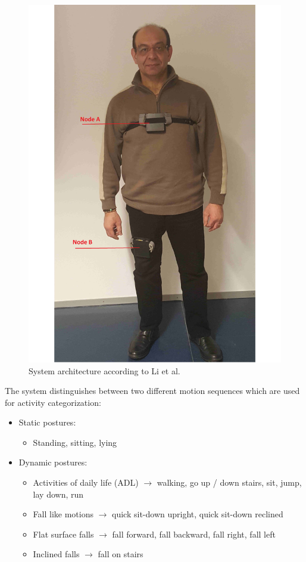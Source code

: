 \documentclass[10pt,journal,compsoc]{IEEEtran}
\begin{document}
\begin{figure}[!ht] 
	\centering
	\includegraphics[scale=0.22]{Images/Stankovic-papa2.pdf}
	\caption[System architecture according to Li et al.]{System architecture according to Li et al. \cite{Li2009}}
	\label{fig:LietAl-Architecture}
\end{figure}
The system distinguishes between two different motion sequences which are used for activity categorization: 
\begin{itemize}
	\item Static postures:
	\begin{itemize}
		\item Standing, sitting, lying
	\end{itemize}
	\item Dynamic postures:
	\begin{itemize}
		\item Activities of daily life (ADL) $\rightarrow$ walking, go up / down stairs, sit, jump, lay down, run
		\item Fall like motions $\rightarrow$ quick sit-down upright, quick sit-down reclined
		\item Flat surface falls $\rightarrow$ fall forward, fall backward, fall right, fall left
		\item Inclined falls $\rightarrow$ fall on stairs
	\end{itemize}
\end{itemize}
\end{document}
